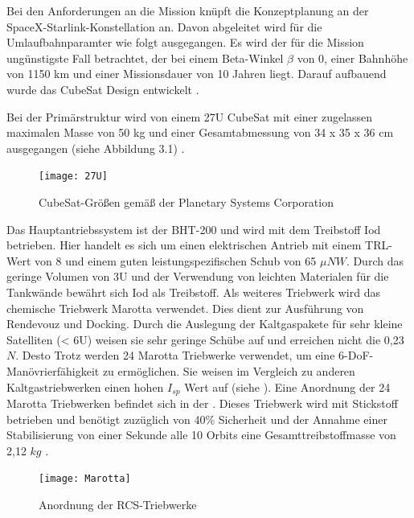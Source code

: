 				
				Bei den Anforderungen an die Mission knüpft die Konzeptplanung an der SpaceX-Starlink-Konstellation an. Davon abgeleitet wird für die Umlaufbahnparamter wie folgt ausgegangen. Es wird der für die Mission ungünstigste Fall betrachtet, der bei einem Beta-Winkel $\beta$ von 0\textdegree, einer Bahnhöhe von 1150 km und einer Missionsdauer von 10 Jahren liegt. Darauf aufbauend wurde das CubeSat Design entwickelt \cite{Lettau.}.
				
				Bei der Primärstruktur wird von einem 27U CubeSat mit einer zugelassen maximalen Masse von 50 kg und einer Gesamtabmessung von 34 x 35 x 36 cm ausgegangen (siehe Abbildung 3.1) \cite{Lettau.}. 
					\begin{figure}[!h]
					\centering
						\texttt{[image: 27U]}
					\caption{CubeSat-Größen gemäß der Planetary Systems Corporation \cite{Lettau.}}
					\label{fig:27U}
				\end{figure}
				
				Das Hauptantriebssystem ist der BHT-200 und wird mit dem Treibstoff Iod betrieben. Hier handelt es sich um einen elektrischen Antrieb mit einem TRL-Wert von 8 und einem guten leistungspezifischen Schub von 65 ${\mu N}{W}$. Durch das geringe Volumen von 3U und der Verwendung von leichten Materialen für die Tankwände bewährt sich Iod als Treibstoff. Als weiteres Triebwerk wird das chemische Triebwerk Marotta verwendet. Dies dient zur Ausführung von Rendevouz und Docking. Durch die Auslegung der Kaltgaspakete für sehr kleine Satelliten (< 6U) weisen sie sehr geringe Schübe auf und erreichen nicht die 0,23 $N$. Desto Trotz werden 24 Marotta Triebwerke verwendet, um eine 6-DoF-Manövrierfähigkeit zu ermöglichen. Sie weisen im Vergleich zu anderen Kaltgastriebwerken einen hohen $I_{sp}$ Wert auf (siehe ). Eine Anordnung der 24 Marotta Triebwerken befindet sich in der . Dieses Triebwerk wird mit Stickstoff betrieben und benötigt zuzüglich von 40\% Sicherheit und der Annahme einer Stabilisierung von einer Sekunde alle 10 Orbits  eine Gesamttreibstoffmasse von 2,12 $kg$ \cite{Lettau.}.
				\begin{figure}[!h]
					\centering
						\texttt{[image: Marotta]}
						\caption{Anordnung der RCS-Triebwerke \cite{Lettau.}}
						\label{fig:marotta}
				\end{figure}
				
